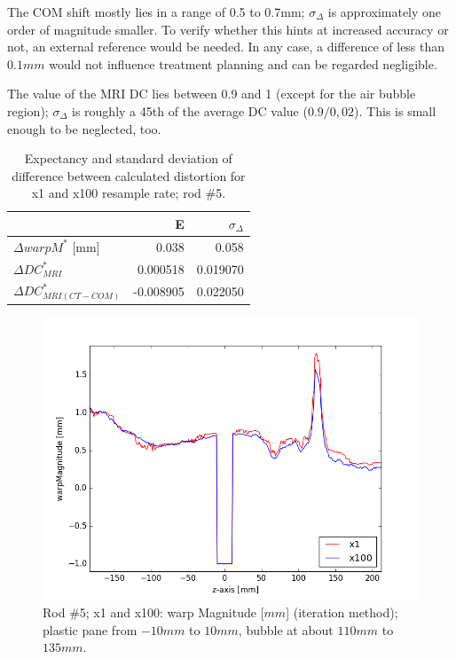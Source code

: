 The COM shift mostly lies in a range of 0.5 to 0.7mm; $\sigma_\Delta$ is approximately one order of magnitude smaller.
To verify whether this hints at increased accuracy or not, an external reference would be needed.
In any case, a difference of less than $0.1mm$ would not influence treatment planning and can be regarded negligible.

The value of the MRI DC lies between 0.9 and 1 (except for the air bubble region); $\sigma_\Delta$ is roughly a 45th of the average DC value ($0.9/0,02$). This is small enough to be neglected, too.

\begin{table}[!tbh]
 \centering
 \caption{Expectancy and standard deviation of difference between calculated distortion for x1 and x100 resample rate; rod \#5.}
\begin{tabular}{l|rr}
& E         & $\sigma_\Delta$   \\
\toprule
$\Delta warpM^*$ [mm]  & 0.038     & 0.058    \\
$\Delta DC^*_{MRI}$         & 0.000518  & 0.019070 \\
$\Delta DC^*_{MRI(CT-COM)}$ & -0.008905 & 0.022050
\end{tabular}
\label{tab:Delta-resample_5}
\end{table}

\begin{figure}[!tbh]
    \centering
    \includegraphics[scale=0.6]{../fig/python/ph2/warp/warpMagnitude_x1-100_iter.png}
    \caption[Rod \#5; x1 and x100: warp Magnitude (iteration method).]{Rod \#5; x1 and x100: warp Magnitude [$mm$] (iteration method); plastic pane from $-10mm$ to $10mm$, bubble at about $110mm$ to $135mm$.}
    \label{fig:ph2_warpMagnitude_x1-100}
\end{figure}

